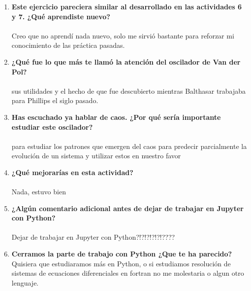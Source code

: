 \documentclass{article}
\begin{document}
\begin{enumerate}
\item \textbf{Este ejercicio pareciera similar al desarrollado en las actividades 6 y 7. ¿Qué aprendiste nuevo?} ~\\~\\

Creo que no aprendí nada nuevo, solo me sirvió bastante para reforzar mi conocimiento de las práctica pasadas.

\item \textbf{¿Qué fue lo que más te llamó la atención del oscilador de Van der Pol? }~\\~\\

sus utilidades y el hecho de que fue descubierto mientras Balthasar trabajaba para Phillips el siglo pasado.

\item \textbf{Has escuchado ya hablar de caos. ¿Por qué sería importante estudiar este oscilador?}~\\~\\

para estudiar los patrones que emergen del caos para predecir parcialmente la evolución de un sistema y utilizar estos en nuestro favor

\item \textbf{¿Qué mejorarías en esta actividad?}~\\~\\
Nada, estuvo bien

\item \textbf{¿Algún comentario adicional antes de dejar de trabajar en Jupyter con Python?}  ~\\~\\
Dejar de trabajar en Jupyter con Python?!?!?!?!?!????


\item \textbf{Cerramos la parte de trabajo con Python ¿Que te ha parecido?} ~\\
Quisiera que estudiaramos más en Python, o si estudiamos resolución de sistemas de ecuaciones diferenciales en fortran no me molestaria o algun otro lenguaje.

\end{enumerate}
\end{document}
